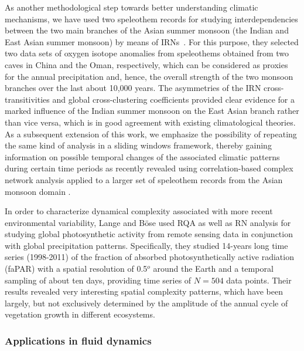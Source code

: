 \documentclass[graybox]{svmult}
\begin{document}
As another methodological step towards better understanding climatic mechanisms, we have used two speleothem records for studying interdependencies between the two main branches of the Asian summer monsoon (the Indian and East Asian summer monsoon) by means of IRNs~\cite{Feldhoff2012}. For this purpose, they selected two data sets of oxygen isotope anomalies from speleothems obtained from two caves in China and the Oman, respectively, which can be considered as proxies for the annual precipitation and, hence, the overall strength of the two monsoon branches over the last about 10,000 years. The asymmetries of the IRN cross-transitivities and global cross-clustering coefficients provided clear evidence for a marked influence of the Indian summer monsoon on the East Asian branch rather than vice versa, which is in good agreement with existing climatological theories. As a subsequent extension of this work, we emphasize the possibility of repeating the same kind of analysis in a sliding windows framework, thereby gaining information on possible temporal changes of the associated climatic patterns during certain time periods as recently revealed using correlation-based complex network analysis applied to a larger set of speleothem records from the Asian monsoon domain \cite{Rehfeld2012}.

In order to characterize dynamical complexity associated with more recent environmental variability, Lange and B\"ose \cite{Boese2012,Lange2013Book} used RQA as well as RN analysis for studying global photosynthetic activity from remote sensing data in conjunction with global precipitation patterns. Specifically, they studied 14-years long time series (1998-2011) of the fraction of absorbed photosynthetically active radiation (faPAR) with a spatial resolution of 0.5$^o$ around the Earth and a temporal sampling of about ten days, providing time series of $N=504$ data points. Their results revealed very interesting spatial complexity patterns, which have been largely, but not exclusively determined by the amplitude of the annual cycle of vegetation growth in different ecosystems.


\subsubsection{Applications in fluid dynamics}
\end{document}
